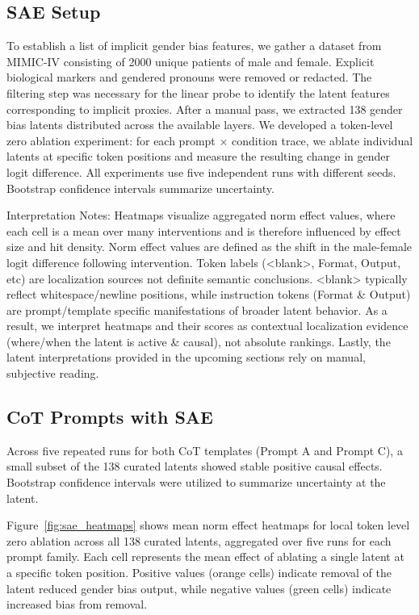\documentclass{article}
\begin{document}
\subsection{SAE Setup}
To establish a list of implicit gender bias features, we gather a dataset from MIMIC-IV consisting of 2000 unique patients of male and female. Explicit biological markers and gendered pronouns were removed or redacted. The filtering step was necessary for the linear probe to identify the latent features corresponding to implicit proxies. After a manual pass, we extracted 138 gender bias latents distributed across the available layers. We developed a token-level zero ablation experiment: for each prompt $\times$ condition trace, we ablate individual latents at specific token positions and measure the resulting change in gender logit difference. All experiments use five independent runs with different seeds. Bootstrap confidence intervals summarize uncertainty.

Interpretation Notes: Heatmaps visualize aggregated norm effect values, where each cell is a mean over many interventions and is therefore influenced by effect size and hit density. Norm effect values are defined as the shift in the male-female logit difference following intervention. Token labels (<blank>, Format, Output, etc) are localization sources not definite semantic conclusions. <blank> typically reflect whitespace/newline positions, while instruction tokens (Format \& Output) are prompt/template specific manifestations of broader latent behavior. As a result, we interpret heatmaps and their scores as contextual localization evidence (where/when the latent is active \& causal), not absolute rankings. Lastly, the latent interpretations provided in the upcoming sections rely on manual, subjective reading.


\subsection{CoT Prompts with SAE}
Across five repeated runs for both CoT templates (Prompt A and Prompt C), a small subset of the 138 curated latents showed stable positive causal effects. Bootstrap confidence intervals were utilized to summarize uncertainty at the latent.

Figure~\ref{fig:sae_heatmaps} shows mean norm effect heatmaps for local token level zero ablation across all 138 curated latents, aggregated over five runs for each prompt family. Each cell represents the mean effect of ablating a single latent at a specific token position. Positive values (orange cells) indicate removal of the latent reduced gender bias output, while negative values (green cells) indicate increased bias from removal.
\end{document}
